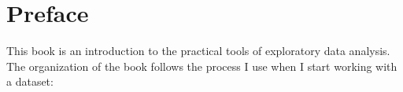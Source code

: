 \documentclass[12pt]{book}
\begin{document}
\chapter{Preface}%
\label{preface}

This book is an introduction to the practical tools of exploratory data analysis.  The
organization of the book follows the process I use when I start working with a dataset:
\end{document}
